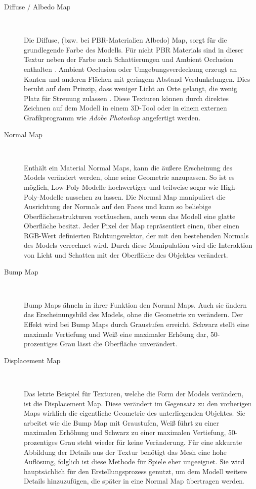 \begin{description}
	\item[Diffuse / Albedo Map]~\par
	Die Diffuse, (bzw. bei PBR-Materialien Albedo) Map, sorgt für die grundlegende Farbe des Modells. Für nicht PBR Materials sind in dieser Textur neben der Farbe auch Schattierungen und Ambient Occlusion enthalten \parencite[S.\,495]{blender}. Ambient Occlusion oder Umgebungsverdeckung erzeugt an Kanten und anderen Flächen mit geringem Abstand Verdunkelungen. Dies beruht auf dem Prinzip, dass weniger Licht an Orte gelangt, die wenig Platz für Streuung zulassen \parencite[S.\,362]{blender}. Diese Texturen können durch direktes Zeichnen auf dem Modell in einem 3D-Tool oder in einem externen Grafikprogramm wie \textit{Adobe Photoshop} angefertigt werden.
	\item[Normal Map]~\par
	Enthält ein Material Normal Maps, kann die äußere Erscheinung des Models verändert werden, ohne seine Geometrie anzupassen. So ist es möglich, Low-Poly-Modelle hochwertiger und teilweise sogar wie High-Poly-Modelle aussehen zu lassen. Die Normal Map manipuliert die Ausrichtung der Normals auf den Faces und kann so beliebige Oberflächenstrukturen vortäuschen, auch wenn das Modell eine glatte Oberfläche besitzt. Jeder Pixel der Map repräsentiert einen, über einen RGB-Wert definierten Richtungsvektor, der mit den bestehenden Normals des Models verrechnet wird. Durch diese Manipulation wird die Interaktion von Licht und Schatten mit der Oberfläche des Objektes verändert. \parencite[S.\,421-422]{blender}
	\item[Bump Map]~\par
	Bump Maps ähneln in ihrer Funktion den Normal Maps. Auch sie ändern das Erscheinungsbild des Models, ohne die Geometrie zu verändern. Der Effekt wird bei Bump Maps durch Graustufen erreicht. Schwarz stellt eine maximale Vertiefung und Weiß eine maximaler Erhöung dar, 50-prozentiges Grau lässt die Oberfläche unverändert. \parencite[S.\,420-421]{blender}
	\newpage
	\item[Displacement Map]~\par
	Das letzte Beispiel für Texturen, welche die Form der Models verändern, ist die Displacement Map. Diese verändert im Gegensatz zu den vorherigen Maps wirklich die eigentliche Geometrie des unterliegenden Objektes. Sie arbeitet wie die Bump Map mit Graustufen, Weiß führt zu einer maximalen Erhöhung und Schwarz zu einer maximalen Vertiefung, 50-prozentiges Grau steht wieder für keine Veränderung. Für eine akkurate Abbildung der Details aus der Textur benötigt das Mesh eine hohe Auflösung, folglich ist diese Methode für Spiele eher ungeeignet. Sie wird hauptsächlich für den Erstellungsprozess genutzt, um dem Modell weitere Details hinzuzufügen, die später in eine Normal Map übertragen werden. \parencite[S.\,422-423]{blender}

\end{description}
